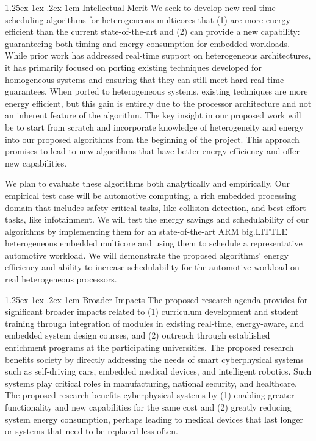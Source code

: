 \documentclass[10pt,letterpaper]{article}
\makeatletter
\renewcommand{\paragraph}{%
  \@startsection{paragraph}{4}%
  {\z@}{1.25ex \@plus 1ex \@minus .2ex}{-1em}%
  {\normalfont\normalsize\bfseries}%
}
\makeatother
\begin{document}
\paragraph{Intellectual Merit} 
We seek to develop new real-time scheduling algorithms for
heterogeneous multicores that (1) are more energy efficient than the
current state-of-the-art and (2) can provide a new capability:
guaranteeing both timing and energy consumption for embedded
workloads.  While prior work has addressed real-time support on
heterogeneous architectures, it has primarily focused on porting
existing techniques developed for homogeneous systems and ensuring
that they can still meet hard real-time guarantees.  When ported to
heterogeneous systems, existing techniques are more energy efficient,
but this gain is entirely due to the processor architecture and not an
inherent feature of the algorithm.  The key insight in our proposed
work will be to start from scratch and incorporate knowledge of
heterogeneity and energy into our proposed algorithms from the
beginning of the project.  This approach promises to lead to new
algorithms that have better energy efficiency and offer new
capabilities.

We plan to evaluate these algorithms both analytically and
empirically.  Our empirical test case will be automotive computing, a
rich embedded processing domain that includes safety critical tasks,
like collision detection, and best effort tasks, like infotainment.  We
will test the energy savings and schedulability of our algorithms by
implementing them for an state-of-the-art ARM big.LITTLE heterogeneous
embedded multicore and using them to schedule a representative
automotive workload.  We will demonstrate the proposed algorithms'
energy efficiency and ability to increase schedulability for the
automotive workload on real heterogeneous processors.

\paragraph{Broader Impacts}
The proposed research agenda provides for significant broader impacts
related to (1) curriculum development and student training through
integration of modules in existing real-time, energy-aware, and
embedded system design courses, and (2) outreach through established
enrichment programs at the participating universities. The proposed
research benefits society by directly addressing the needs of smart
cyberphysical systems such as self-driving cars, embedded medical
devices, and intelligent robotics.  Such systems play critical roles
in manufacturing, national security, and healthcare. The proposed
research benefits cyberphysical systems by (1) enabling greater
functionality and new capabilities for the same cost and (2) greatly
reducing system energy consumption, perhaps leading to medical devices
that last longer or systems that need to be replaced less often.
\end{document}

